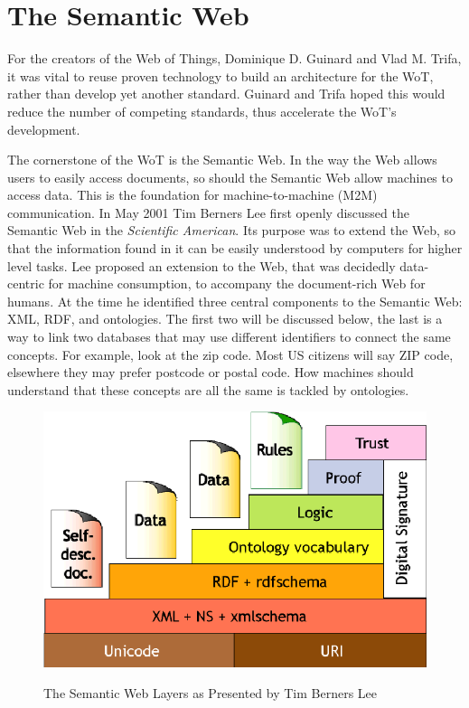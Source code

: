 \section{The Semantic Web}
For the creators of the Web of Things, Dominique D. Guinard and Vlad M. Trifa, it was vital to reuse proven technology to build an architecture for the WoT, rather than develop yet another standard. Guinard and Trifa hoped this would reduce the number of competing standards, thus accelerate the WoT's development. \cite{Guinard.2016}

The cornerstone of the WoT is the Semantic Web. In the way the Web allows users to easily access documents, so should the Semantic Web allow machines to access data. This is the foundation for machine-to-machine (M2M) communication. In May 2001 Tim Berners Lee first openly discussed the Semantic Web in the \textit{Scientific American}. Its purpose was to extend the Web, so that the information found in it can be easily understood by computers for higher level tasks. Lee proposed an extension to the Web, that was decidedly data-centric for machine consumption, to accompany the document-rich Web for humans. At the time he identified three central components to the Semantic Web: XML, RDF, and ontologies. The first two will be discussed below, the last is a way to link two databases that may use different identifiers to connect the same concepts. For example, look at the zip code. Most US citizens will say ZIP code, elsewhere they may prefer postcode or postal code. How machines should understand that these concepts are all the same is tackled by ontologies. \cite{berners2001semantic}

\begin{figure}[th]
\centering
\includegraphics[width=\textwidth]{Figures/SemWebLayer}
\caption{The Semantic Web Layers as Presented by Tim Berners Lee}
\cite{berners2001semantic}
\label{fig:semWebCake}
\end{figure}





